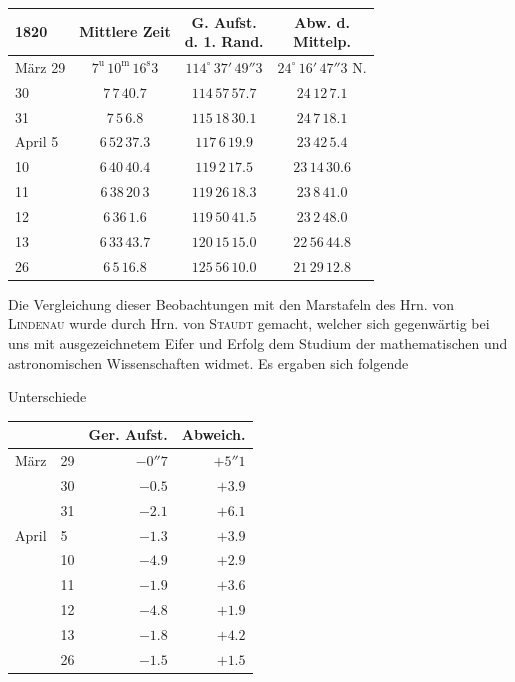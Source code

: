 \begin{center}
\begin{tabular}{l|c|c|c}
1820 & Mittlere Zeit & \shortstack{G. Aufst.\\d. 1. Rand.} & \shortstack{Abw. d.\\Mittelp.} \\
\hline
März 29 & $7^{\mathrm u}\,10^{\mathrm m}\,16^{\mathrm s}3$ & $114^\circ\,37'\,49''3$ & $24^\circ\,16'\,47''3$ N. \\
30 & $7\,7\,40.7$ & $114\,57\,57.7$ & $24\,12\,7.1$ \\
31 & $7\,5\,6.8$ & $115\,18\,30.1$ & $24\,7\,18.1$ \\
April 5 & $6\,52\,37.3$ & $117\,6\,19.9$ & $23\,42\,5.4$ \\
10 & $6\,40\,40.4$ & $119\,2\,17.5$ & $23\,14\,30.6$ \\
11 & $6\,38\,20\,3$ & $119\,26\,18.3$ & $23\,8\,41.0$ \\
12 & $6\,36\,1.6$ & $119\,50\,41.5$ & $23\,2\,48.0$ \\
13 & $6\,33\,43.7$ & $120\,15\,15.0$ & $22\,56\,44.8$ \\
26 & $6\,5\,16.8$ & $125\,56\,10.0$ & $21\,29\,12.8$ \\
\end{tabular}
\end{center}

Die Vergleichung dieser Beobachtungen mit den Marstafeln des Hrn. von \textsc{Lindenau}
wurde durch Hrn. von \textsc{Staudt} gemacht, welcher sich gegenwärtig bei uns mit
ausgezeichnetem Eifer und Erfolg dem Studium der mathematischen und astronomischen
Wissenschaften widmet. Es ergaben sich folgende

\begin{center}
Unterschiede

\begin{tabular}{ll|r|r}
 & & Ger. Aufst. & Abweich. \\
\hline
März & 29 & $-0''7$ & $+5''1$ \\
 & 30 & $-0.5$ & $+3.9$ \\
 & 31 & $-2.1$ & $+6.1$ \\
April & 5 & $-1.3$ & $+3.9$ \\
 & 10 & $-4.9$ & $+2.9$ \\
 & 11 & $-1.9$ & $+3.6$ \\
 & 12 & $-4.8$ & $+1.9$ \\
 & 13 & $-1.8$ & $+4.2$ \\
 & 26 & $-1.5$ & $+1.5$ \\
\end{tabular}
\end{center}
